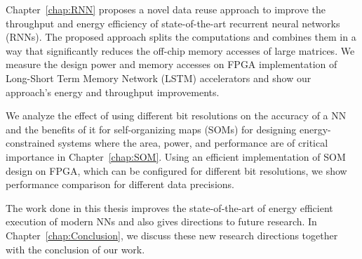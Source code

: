 Chapter~\ref{chap:RNN} proposes a novel data reuse approach to improve the throughput and energy efficiency of state-of-the-art recurrent neural networks (RNNs). The proposed approach splits the computations and combines them in a way that significantly reduces the off-chip memory accesses of large matrices. We measure the design power and memory accesses on FPGA implementation of Long-Short Term Memory Network (LSTM) accelerators and show our approach's energy and throughput improvements.

We analyze the effect of using different bit resolutions on the accuracy of a NN and the benefits of it for self-organizing maps (SOMs) for designing energy-constrained systems where the area, power, and performance are of critical importance in Chapter~\ref{chap:SOM}. Using an efficient implementation of SOM design on FPGA, which can be configured for different bit resolutions, we show performance comparison for different data precisions. 

The work done in this thesis improves the state-of-the-art of energy efficient execution of modern NNs and also gives directions to future research. In Chapter~\ref{chap:Conclusion}, we discuss these new research directions together with the conclusion of our work.